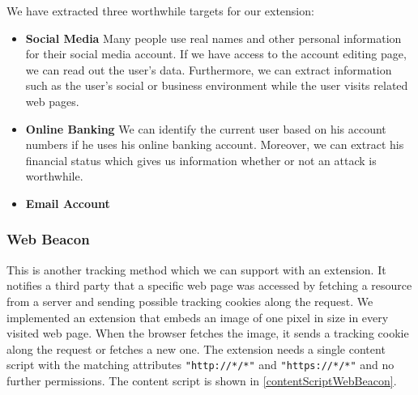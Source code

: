 	We have extracted three worthwhile targets for our extension:
	\begin{itemize}
		\item \textbf{Social Media} Many people use real names and other personal information for their social media account. If we have access to the account editing page, we can read out the user's data. Furthermore, we can extract information such as the user's social or business environment while the user visits related web pages.
		\item \textbf{Online Banking} We can identify the current user based on his account numbers if he uses his online banking account. Moreover, we can extract his financial status which gives us information whether or not an attack is worthwhile.
		\item \textbf{Email Account} 
	\end{itemize}
	
	
	
	

\subsubsection{Web Beacon}
	
	This is another tracking method which we can support with an extension. It notifies a third party that a specific web page was accessed by fetching a resource from a server and sending possible tracking cookies along the request. We implemented an extension that embeds an image of one pixel in size in every visited web page. When the browser fetches the image, it sends a tracking cookie along the request or fetches a new one. The extension needs a single content script with the matching attributes \texttt{"http://*/*"} and \texttt{"https://*/*"} and no further permissions. The content script is shown in \autoref{contentScriptWebBeacon}.
	
